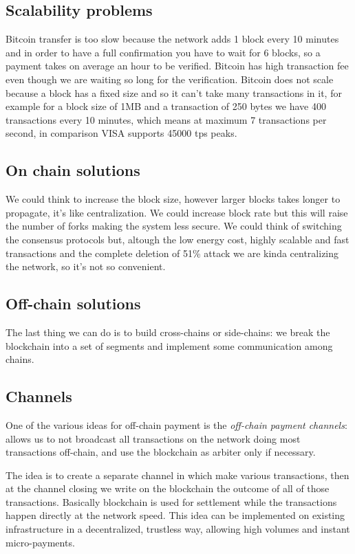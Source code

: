 \subsection{Scalability problems}
Bitcoin transfer is too slow because the network adds 1 block every 10 minutes and in order to have a full confirmation you have to wait for 6 blocks, so a payment takes on average an hour to be verified.
Bitcoin has high transaction fee even though we are waiting so long for the verification.
Bitcoin does not scale because a block has a fixed size and so it can't take many transactions in it, for example for a block size of 1MB and a transaction of 250 bytes we have 400 transactions every 10 minutes, which means at maximum 7 transactions per second, in comparison VISA supports 45000 tps peaks.

\subsection{On chain solutions}
We could think to increase the block size, however larger blocks takes longer to propagate, it's like centralization.
We could increase block rate but this will raise the number of forks making the system less secure.
We could think of switching the consensus protocols but, altough the low energy cost, highly scalable and fast transactions and the complete deletion of 51\% attack we are kinda centralizing the network, so it's not so convenient.

\subsection{Off-chain solutions}
The last thing we can do is to build cross-chains or side-chains: we break the blockchain into a set of segments and implement some communication among chains.

\subsection{Channels}
One of the various ideas for off-chain payment is the \emph{off-chain payment channels}: allows us to not broadcast all transactions on the network doing most transactions off-chain, and use the blockchain as arbiter only if necessary.

The idea is to create a separate channel in which make various transactions, then at the channel closing we write on the blockchain the outcome of all of those transactions.
Basically blockchain is used for settlement while the transactions happen directly at the network speed.
This idea can be implemented on existing infrastructure in a decentralized, trustless way, allowing high volumes and instant micro-payments.

